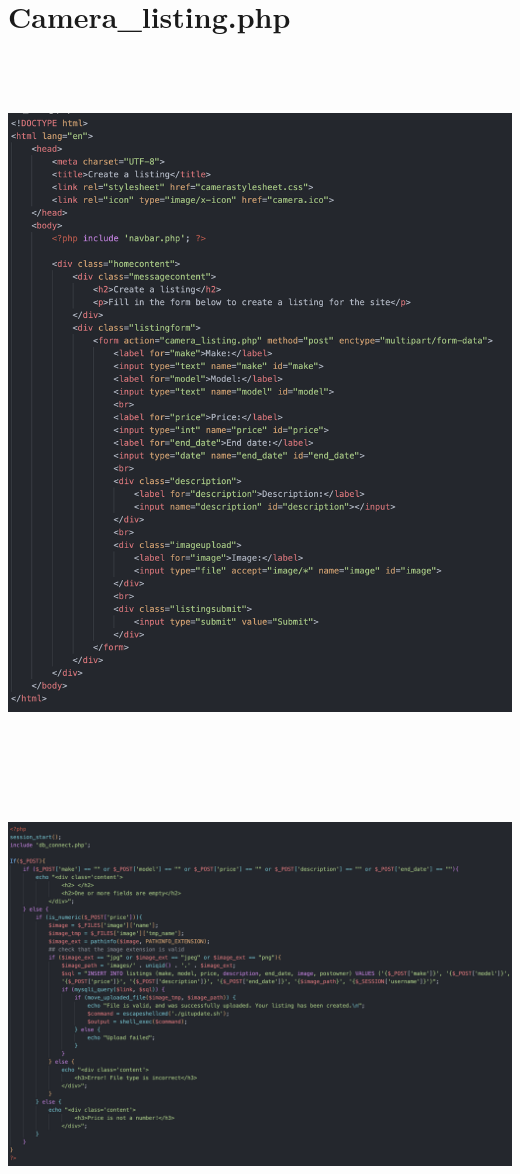 \section*{Camera\_listing.php}\includegraphics[width=6.26806in,height=7.44306in]{ch6_appendix/media/image13.png}

\includegraphics[width=6.26806in,height=4.2875in]{ch6_appendix/media/image14.png}

